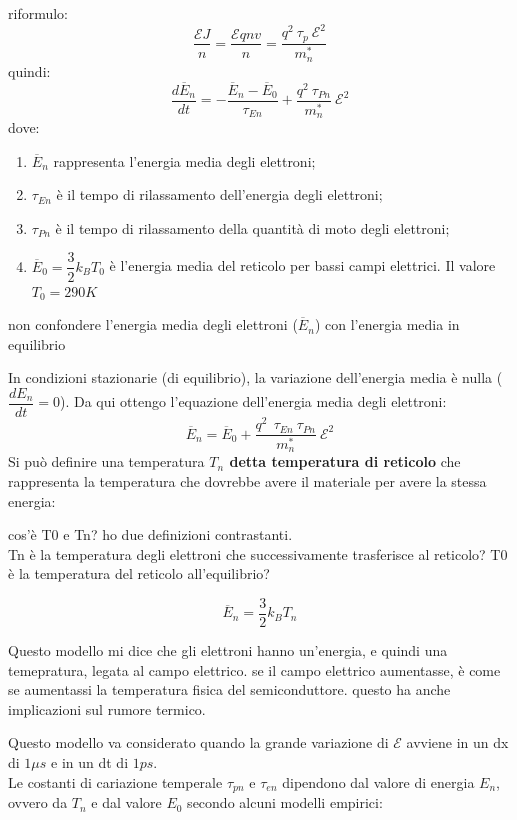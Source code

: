riformulo:
%
\begin{equation}
    \dfrac{\mathcal{E}J}{n}=  \dfrac{\mathcal{E} q n v}{n}=\dfrac{q^2\ \tau_p \ \mathcal{E}^2}{m_n^*}
\end{equation}
%
quindi:
%
\begin{equation}
    \dfrac{d\overline{E}_n}{dt} = -\dfrac{\overline{E}_n - \overline{E}_0}{\tau_{En}} + \dfrac{q^2\ \tau_{Pn}}{m_n^*}\ \mathcal{E}^2
\end{equation}
%
dove:
%
\begin{enumerate}
    \item $\overline{E}_n$ rappresenta l'energia media degli elettroni;
    \item $\tau_{En}$ è il tempo di rilassamento dell'energia degli elettroni;
    \item $\tau_{Pn}$ è il tempo di rilassamento della quantità di moto degli elettroni;
    \item $\overline{E}_0= \dfrac{3}{2}k_BT_0$ è l'energia media del reticolo per bassi campi elettrici. Il valore $T_0 = 290K$
\end{enumerate}
%
\begin{exbox}[ATTENZIONE]
    non confondere l'energia media degli elettroni ($\overline{E}_n$) con l'energia media in equilibrio
\end{exbox}
%
In condizioni stazionarie (di equilibrio), la variazione dell'energia media è nulla ($\dfrac{dE_n}{dt} = 0$). Da qui ottengo l'equazione dell'energia media degli elettroni:
\begin{equation}
    \overline{E}_n= \overline{E}_0+\dfrac{q^2\ \ \tau_{En}\ \tau_{Pn}}{m_n^*}\ \mathcal{E}^2
\end{equation}
%
Si può definire una temperatura \textbf{$T_n$ detta temperatura di reticolo} che rappresenta la temperatura che dovrebbe avere il materiale per avere la stessa energia:
%
\begin{ricevimento}
    cos'è T0 e Tn? ho due definizioni contrastanti.\\
    Tn è la temperatura degli elettroni che successivamente trasferisce al reticolo?
    T0 è la temperatura del reticolo all'equilibrio?
\end{ricevimento}
%
\begin{equation}
    \overline{E}_n=\dfrac{3}{2}k_BT_n
\end{equation}
%
\begin{exbox}
   Questo modello mi dice che gli elettroni hanno un'energia, e quindi una temepratura, legata al campo elettrico. se il campo elettrico aumentasse, è come se aumentassi la temperatura fisica del semiconduttore. questo ha anche implicazioni sul rumore termico.
\end{exbox}
%
Questo modello va considerato quando la grande variazione di $\mathcal{E}$ avviene in un dx di $1\mu s$ e in un dt di $1 ps$.\\
Le costanti di cariazione temperale $\tau_{pn}$ e $\tau_{en}$ dipendono dal valore di energia $E_n$, ovvero da $T_n$ e dal valore $E_0$ secondo alcuni modelli empirici:
%
\cleardoublepage
%
